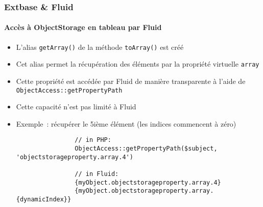 \begin{frame}[fragile]
	\frametitle{Extbase \& Fluid}
	\framesubtitle{Accès à ObjectStorage en tableau par Fluid}

	\lstset{basicstyle=\tiny\ttfamily}

	\begin{itemize}

		\item L'alias \texttt{getArray()} de la méthode \texttt{toArray()} est créé

		\item Cet alias permet la récupération des éléments par la propriété virtuelle
			\texttt{array}

		\item Cette propriété est accédée par Fluid de manière transparente à l'aide de
			\texttt{ObjectAccess::getPropertyPath}

		\item Cette capacité n'est pas limité à Fluid

		\item Exemple~: récupérer le 5ième élément (les indices commencent à zéro)

			\begin{lstlisting}
				// in PHP:
				ObjectAccess::getPropertyPath($subject, 'objectstorageproperty.array.4')

				// in Fluid:
				{myObject.objectstorageproperty.array.4}
				{myObject.objectstorageproperty.array.{dynamicIndex}}
			\end{lstlisting}

	\end{itemize}

\end{frame}

